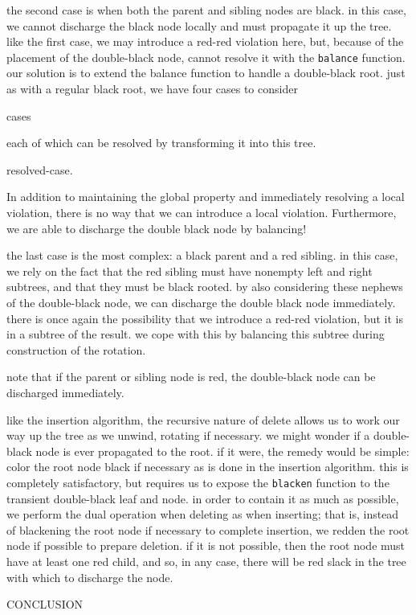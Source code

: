\documentclass[preprint]{sigplanconf}
\begin{document}
the second case is when both the parent and sibling nodes are black. in this case, we cannot discharge the black node locally and must propagate it up the tree. like the first case, we may introduce a red-red violation here, but, because of the placement of the double-black node, cannot resolve it with the \texttt{balance} function. our solution is to extend the balance function to handle a double-black root. just as with a regular black root, we have four cases to consider

cases

each of which can be resolved by transforming it into this tree.

resolved-case.

In addition to maintaining the global property and immediately resolving a local violation, there is no way that we can introduce a local violation. Furthermore, we are able to discharge the double black node by balancing!

the last case is the most complex: a black parent and a red sibling. in this case, we rely on the fact that the red sibling must have nonempty left and right subtrees, and that they must be black rooted. by also considering these nephews of the double-black node, we can discharge the double black node immediately. there is once again the possibility that we introduce a red-red violation, but it is in a subtree of the result. we cope with this by balancing this subtree during construction of the rotation.

note that if the parent or sibling node is red, the double-black node can be discharged immediately.

like the insertion algorithm, the recursive nature of delete allows us to work our way up the tree as we unwind, rotating if necessary. we might wonder if a double-black node is ever propagated to the root. if it were, the remedy would be simple: color the root node black if necessary as is done in the insertion algorithm. this is completely satisfactory, but requires us to expose the \texttt{blacken} function to the transient double-black leaf and node. in order to contain it as much as possible, we perform the dual operation when deleting as when inserting; that is, instead of blackening the root node if necessary to complete insertion, we redden the root node if possible to prepare deletion. if it is not possible, then the root node must have at least one red child, and so, in any case, there will be red slack in the tree with which to discharge the node.

CONCLUSION
\end{document}
